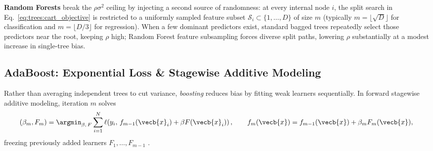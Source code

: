 \documentclass[../../../../master.tex]{subfiles}
\begin{document}
\textbf{Random Forests}  break the $\rho\sigma^2$ ceiling by injecting a second source of randomness: at every internal node $i$, the split search in Eq.~\eqref{eq:trees:cart_objective} is restricted to a uniformly sampled feature subset $\mathcal{S}_i \subset \{1, \dots, D\}$ of size $m$ (typically $m = \lfloor \sqrt{D} \rfloor$ for classification and $m = \lfloor D/3 \rfloor$ for regression). When a few dominant predictors exist, standard bagged trees repeatedly select those predictors near the root, keeping $\rho$ high; Random Forest feature subsampling forces diverse split paths, lowering $\rho$ substantially at a modest increase in single-tree bias.

\subsection{AdaBoost: Exponential Loss \& Stagewise Additive Modeling}

Rather than averaging independent trees to cut variance, \emph{boosting} reduces bias by fitting weak learners sequentially. In forward stagewise additive modeling, iteration $m$ solves
\begin{equation}
  (\beta_m, F_m) = \argmin_{\beta,\, F} \sum_{i=1}^{N} \ell\!\left(y_i,\, f_{m-1}(\vecb{x}_i) + \beta F(\vecb{x}_i)\right),
  \qquad f_m(\vecb{x}) = f_{m-1}(\vecb{x}) + \beta_m F_m(\vecb{x}),
  \label{eq:trees:fsam}
\end{equation}
freezing previously added learners $F_1, \dots, F_{m-1}$ .
\end{document}
